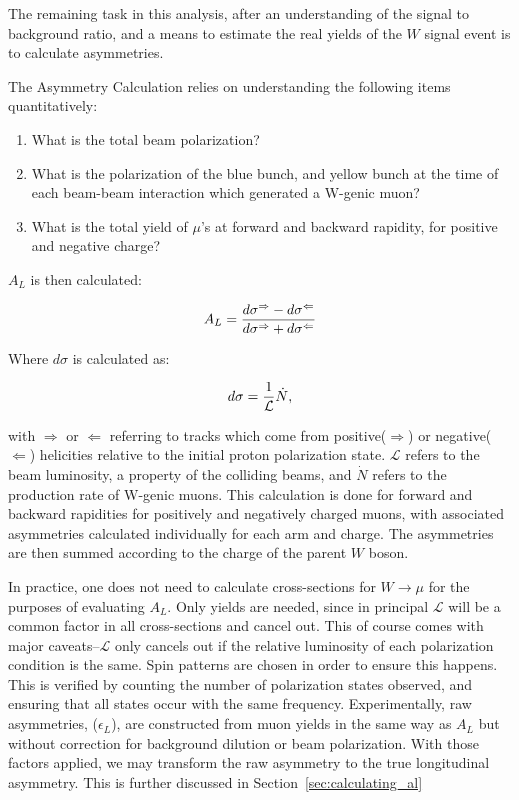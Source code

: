 The remaining task in this analysis, after an understanding of the signal to
background ratio, and a means to estimate the real yields of the $W$ signal
event is to calculate asymmetries.

{\noindent}The Asymmetry Calculation relies on understanding the following items
quantitatively:

\begin{enumerate}
  \item What is the total beam polarization?
  \item What is the polarization of the blue bunch, and yellow bunch at the
    time of each beam-beam interaction which generated a W-genic muon?
  \item What is the total yield of $\mu$'s at forward and backward rapidity,
    for positive and negative charge?
\end{enumerate}

{\noindent}$A_L$ is then calculated:

\begin{equation}
  A_L = {
    {d\sigma^{\Rightarrow} - d\sigma^{\Leftarrow}}
    \over
    {d\sigma^{\Rightarrow} + d\sigma^{\Leftarrow}}
  }
\end{equation}

{\noindent}Where $d\sigma$ is calculated as:

\begin{equation}
  d\sigma = {1\over{\mathcal{L}}}{\dot{N}},
\end{equation}

with $\Rightarrow$ or $\Leftarrow$ referring to tracks which come from
positive($\Rightarrow$) or negative($\Leftarrow$) helicities relative to the
initial proton polarization state. $\mathcal{L}$ refers to the beam luminosity,
a property of the colliding beams, and $\dot{N}$ refers to the production rate
of W-genic muons. This calculation is done for forward and backward
rapidities for positively and negatively charged muons, with associated
asymmetries calculated individually for each arm and charge. The asymmetries are
then summed according to the charge of the parent $W$ boson.

In practice, one does not need to calculate cross-sections for $W\rightarrow\mu$ for
the purposes of evaluating $A_L$. Only yields are needed, since in principal
$\mathcal{L}$ will be a common factor in all cross-sections and cancel out. This
of course comes with major caveats--$\mathcal{L}$ only cancels out if the
relative luminosity of each polarization condition is the same. Spin patterns
are chosen in order to ensure this happens. This is verified by counting the
number of polarization states observed, and ensuring that all states occur with
the same frequency.  Experimentally, raw asymmetries, ($\epsilon_{L}$), are
constructed from  muon yields in the same way as $A_L$ but without correction
for background dilution or beam polarization. With those factors applied, we may
transform the raw asymmetry to the true longitudinal asymmetry. This is further
discussed in Section~\ref{sec:calculating_al}

